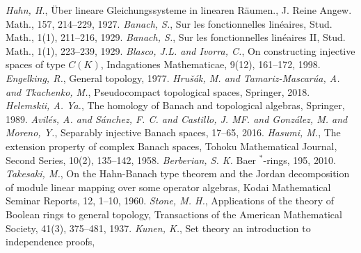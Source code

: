 \documentclass[12pt]{article}
\begin{document}

\begin{thebibliography}{999}
    \textit{Hahn, H.},
    {\"U}ber lineare Gleichungssysteme in linearen R{\"a}umen.,
    J. Reine Angew. Math.,
    157,
    214--229,
    1927.
    \textit{Banach, S.},
    Sur les fonctionnelles lin{\'e}aires,
    Stud. Math.,
    1(1),
    211--216,
    1929.
    \textit{Banach, S.},
    Sur les fonctionnelles lin{\'e}aires II,
    Stud. Math.,
    1(1),
    223--239,
    1929.
    \textit{Blasco, J.L. and Ivorra, C.},
    On constructing injective spaces of type $C(K)$,
    Indagationes Mathematicae,
    9(12),
    161--172,
    1998.
    \textit{Engelking, R.},
    General topology,
    1977.
    \textit{Hru{\v{s}}{\'a}k, M. and Tamariz-Mascar{\'u}a, A. and Tkachenko, M.},
    Pseudocompact topological spaces,
    Springer,
    2018.
    \textit{Helemskii, A. Ya.},
    The homology of Banach and topological algebras,
    Springer,
    1989.
    \textit{Avil{\'e}s, A. and S{\'a}nchez, F. C. and Castillo, J. MF. and Gonz{\'a}lez, M. and Moreno, Y.},
    Separably injective Banach spaces,
    17--65,
    2016.
    \textit{Hasumi, M.},
    The extension property of complex Banach spaces,
    Tohoku Mathematical Journal, Second Series,
    10(2),
    135--142,
    1958.
    \textit{Berberian, S. K.}
    Baer $^*$-rings,
    195,
    2010.
    \textit{Takesaki, M.},
    On the Hahn-Banach type theorem and the Jordan decomposition of module linear mapping over some operator algebras,
    Kodai Mathematical Seminar Reports,
    12,
    1--10,
    1960.
    \textit{Stone, M. H.},
    Applications of the theory of Boolean rings to general topology,
    Transactions of the American Mathematical Society,
    41(3),
    375--481,
    1937.
    \textit{Kunen, K.},
    Set theory an introduction to independence proofs,

\end{thebibliography}
\end{document}
